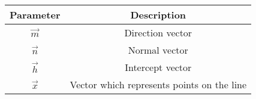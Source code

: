 \begin{tabular}[12pt]{ |c|c|}
    \hline
    Parameter & Description\\ 
    \hline
    $\vec{m}$ & Direction vector\\
    \hline
    $\vec{n}$ & Normal vector\\
    \hline
    $\vec{h}$ & Intercept vector\\
    \hline
    $\vec{x}$ & Vector which represents points on the line\\
    \hline
    \end{tabular}
